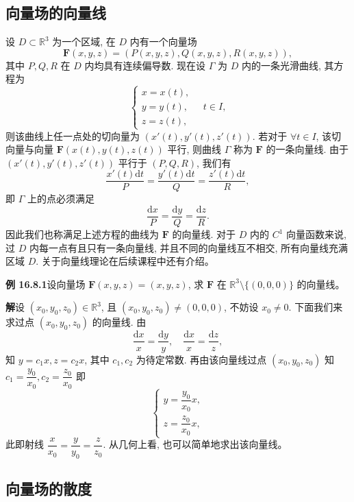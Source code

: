\documentclass[UTF8, 12pt, fontset=fandol, oneside]{ctexart}
\begin{document}
\subsection{向量场的向量线}

设 $D\subset\mathbb R^3$ 为一个区域, 在 $D$ 内有一个向量场
\[
  \boldsymbol F(x,y,z)=(P(x,y,z),Q(x,y,z),R(x,y,z)),
\]
其中 $P,Q,R$ 在 $D$ 内均具有连续偏导数. 现在设 $\Gamma$ 为 $D$ 内的一条光滑曲线, 其方程为
\[
  \begin{cases}
    x=x(t),\\
    y=y(t),\\
    z=z(t),
  \end{cases}\quad t\in I,
\]
则该曲线上任一点处的切向量为 $(x'(t),y'(t),z'(t))$. 若对于 $\forall t\in I$, 该切向量与向量 $\boldsymbol F(x(t),y(t),z(t))$ 平行, 则曲线 $\Gamma$ 称为 $\boldsymbol F$ 的一条向量线. 由于 $(x'(t),y'(t),z'(t))$ 平行于 $(P,Q,R)$, 我们有
\[
  \frac{x'(t)\mathrm dt}{P}=\frac{y'(t)\mathrm dt}{Q}=\frac{z'(t)\mathrm dt}{R},
\]
即 $\Gamma$ 上的点必须满足
\[
  \frac{\mathrm dx}{P}=\frac{\mathrm dy}{Q}=\frac{\mathrm dz}{R}.
\]
因此我们也称满足上述方程的曲线为 $\boldsymbol F$ 的向量线. 对于 $D$ 内的 $C^1$ 向量函数来说, 过 $D$ 内每一点有且只有一条向量线, 并且不同的向量线互不相交, 所有向量线充满区域 $D$. 关于向量线理论在后续课程中还有介绍。

\noindent\textbf{例 16.8.1}\quad 设向量场 $\boldsymbol F(x,y,z)=(x,y,z)$, 求 $\boldsymbol F$ 在 $\mathbb R^3\setminus\{(0,0,0)\}$ 的向量线。

\noindent\textbf{解}\quad 设 $(x_0,y_0,z_0)\in\mathbb R^3$, 且 $(x_0,y_0,z_0)\ne(0,0,0)$, 不妨设 $x_0\ne0$. 下面我们来求过点 $(x_0,y_0,z_0)$ 的向量线. 由
\[
  \frac{\mathrm dx}{x}=\frac{\mathrm dy}{y},\quad
  \frac{\mathrm dx}{x}=\frac{\mathrm dz}{z},
\]
知 $y=c_1x,z=c_2x$, 其中 $c_1,c_2$ 为待定常数. 再由该向量线过点 $(x_0,y_0,z_0)$ 知 $c_1=\dfrac{y_0}{x_0},c_2=\dfrac{z_0}{x_0}$ 即
\[
  \begin{cases}
    y=\dfrac{y_0}{x_0}x,\\
    z=\dfrac{z_0}{x_0}x,
  \end{cases}
\]
此即射线 $\dfrac{x}{x_0}=\dfrac{y}{y_0}=\dfrac{z}{z_0}$. 从几何上看, 也可以简单地求出该向量线。

\subsection{向量场的散度}
\end{document}
